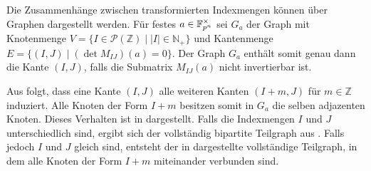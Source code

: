 Die Zusammenhänge zwischen transformierten Indexmengen können über Graphen dargestellt werden. Für festes $a \in \field{p}[n]^\times$ sei $G_a$ der Graph mit Knotenmenge $V=\{I \in\mathcal{P}(\mathbb{Z}) \mid |I| \in \mathbb{N}_+\}$ und Kantenmenge $E = \{(I,J)\mid (\det M_{IJ})(a) = 0\}$. Der Graph $G_a$ enthält somit genau dann die Kante $(I,J)$, falls die Submatrix $M_{IJ}(a)$ nicht invertierbar ist. 

Aus  folgt, dass eine Kante $(I,J)$ alle weiteren Kanten $(I+m,J)$ für $m\in \mathbb{Z}$ induziert. Alle Knoten der Form $I+m$ besitzen somit in $G_a$ die selben adjazenten Knoten. Dieses Verhalten ist in  dargestellt. Falls die Indexmengen $I$ und $J$ unterschiedlich sind, ergibt sich der vollständig bipartite Teilgraph aus . Falls jedoch $I$ und $J$ gleich sind, entsteht der in  dargestellte vollständige Teilgraph, in dem alle Knoten der Form $I+m$ miteinander verbunden sind. 

